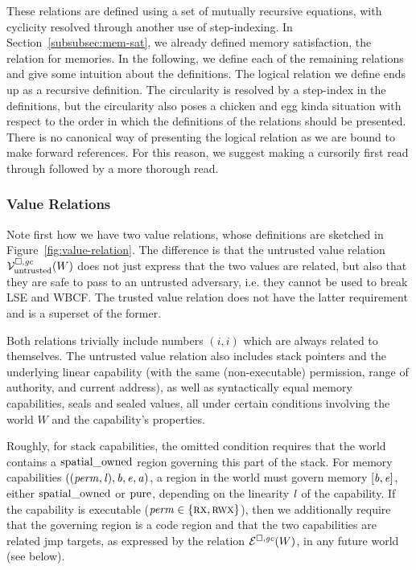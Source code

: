 These relations are defined using a set of mutually recursive equations, with cyclicity resolved through another use of step-indexing.
In Section~\ref{subsubsec:mem-sat}, we already defined memory satisfaction, the relation for memories.
In the following, we define each of the remaining relations and give some intuition about the definitions.
The logical relation we define ends up as a recursive definition.
The circularity is resolved by a step-index in the definitions, but the circularity also poses a chicken and egg kinda situation with respect to the order in which the definitions of the relations should be presented.
There is no canonical way of presenting the logical relation as we are bound to make forward references.
For this reason, we suggest making a cursorily first read through followed by a more thorough read.

\subsubsection{Value Relations}
Note first how we have two value relations, whose definitions are sketched in Figure~\ref{fig:value-relation}.
The difference is that the untrusted value relation $\mathcal{V}^{\square,\mathit{gc}}_{\mathrm{untrusted}}(W)$ does not just express that the two values are related, but also that they are safe to pass to an untrusted adversary, i.e. they cannot be used to break LSE and WBCF.
The trusted value relation does not have the latter requirement and is a superset of the former.

Both relations trivially include numbers $(i,i)$ which are always related to themselves.
The untrusted value relation also includes stack pointers and the underlying linear capability (with the same (non-executable) permission, range of authority, and current address), as well as syntactically equal memory capabilities, seals and sealed values, all under certain conditions involving the world $W$ and the capability's properties.

Roughly, for stack capabilities, the omitted condition requires that the world contains a $\mathrm{spatial\_owned}$ region governing this part of the stack.
For memory capabilities $((\mathit{perm},\mathit{l}),\mathit{b},\mathit{e},\mathit{a})$, a region in the world must govern memory $[\mathit{b},\mathit{e}]$, either $\mathrm{spatial\_owned}$ or $\mathrm{pure}$, depending on the linearity $\mathit{l}$ of the capability.
If the capability is executable ($\mathit{perm} \in \{\textsc{rx},\textsc{rwx}\}$), then we additionally require that the governing region is a code region and that the two capabilities are related $\mathrm{jmp}$ targets, as expressed by the relation $\mathcal{E}^{\square,\mathit{gc}}(W)$, in any future world (see below).

